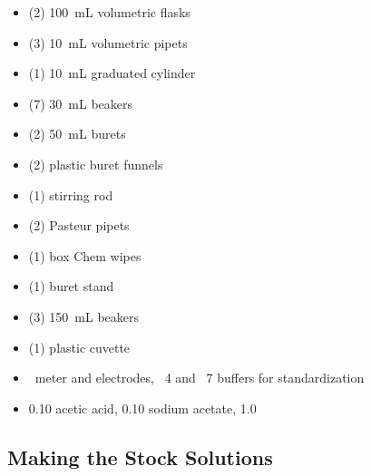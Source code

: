 \begin{itemize}
	\item (2) \qty{100}{\mL} volumetric flasks
	\item (3) \qty{10}{\mL} volumetric pipets
	\item (1) \qty{10}{\mL} graduated cylinder
	\item (7) \qty{30}{\mL} beakers
	\item (2) \qty{50}{\mL} burets
	\item (2) plastic buret funnels
	\item (1) stirring rod
	\item (2) Pasteur pipets
	\item (1) box Chem wipes
	\item (1) buret stand
	\item (3) \qty{150}{\mL} beakers
	\item (1) plastic cuvette
	\item \pH\ meter and electrodes, \pH\ 4 and \pH\ 7 buffers for standardization
	\item \qty{0.10}{\Molar} acetic acid, \qty{0.10}{\Molar} sodium acetate, \qty{1.0}{\Molar} 
\end{itemize}

\subsection{Making the Stock Solutions}
\label{subs:stock_solutions}


